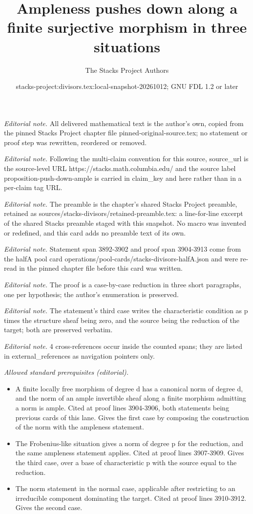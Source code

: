 \documentclass[10pt,a4paper]{amsart}
\title{Ampleness pushes down along a finite surjective morphism in three situations}
\author{The Stacks Project Authors}
\date{stacks-project:divisors.tex:local-snapshot-20261012; GNU FDL 1.2 or later}
\theoremstyle{plain}
\theoremstyle{definition}
\theoremstyle{remark}
\numberwithin{equation}{subsection}
\begin{document}
\maketitle
\noindent\textit{Editorial note.} All delivered mathematical text is the author's own, copied from the pinned Stacks Project chapter file pinned-original-source.tex; no statement or proof step was rewritten, reordered or removed.\par\medskip
\noindent\textit{Editorial note.} Following the multi-claim convention for this source, source\_url is the source-level URL https://stacks.math.columbia.edu/ and the source label proposition-push-down-ample is carried in claim\_key and here rather than in a per-claim tag URL.\par\medskip
\noindent\textit{Editorial note.} The preamble is the chapter's shared Stacks Project preamble, retained as sources/stacks-divisors/retained-preamble.tex: a line-for-line excerpt of the shared Stacks preamble staged with this snapshot. No macro was invented or redefined, and this card adds no preamble text of its own.\par\medskip
\noindent\textit{Editorial note.} Statement span 3892-3902 and proof span 3904-3913 come from the halfA pool card operations/pool-cards/stacks-divisors-halfA.json and were re-read in the pinned chapter file before this card was written.\par\medskip
\noindent\textit{Editorial note.} The proof is a case-by-case reduction in three short paragraphs, one per hypothesis; the author's enumeration is preserved.\par\medskip
\noindent\textit{Editorial note.} The statement's third case writes the characteristic condition as p times the structure sheaf being zero, and the source being the reduction of the target; both are preserved verbatim.\par\medskip
\noindent\textit{Editorial note.} 4 cross-references occur inside the counted spans; they are listed in external\_references as navigation pointers only.\par\medskip
\noindent\textit{Allowed standard prerequisites (editorial).}\begin{itemize}
\item A finite locally free morphism of degree d has a canonical norm of degree d, and the norm of an ample invertible sheaf along a finite morphism admitting a norm is ample. Cited at proof lines 3904-3906, both statements being previous cards of this lane. Gives the first case by composing the construction of the norm with the ampleness statement.
\item The Frobenius-like situation gives a norm of degree p for the reduction, and the same ampleness statement applies. Cited at proof lines 3907-3909. Gives the third case, over a base of characteristic p with the source equal to the reduction.
\item The norm statement in the normal case, applicable after restricting to an irreducible component dominating the target. Cited at proof lines 3910-3912. Gives the second case.
\end{itemize}\medskip
\end{document}
